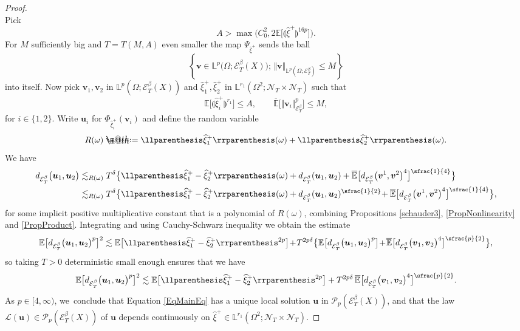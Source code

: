 \documentclass[JEP,XML,SOM,Unicode,published]{cedram}
\makeatletter
\theoremstyle{definition}
\newcommand\bbE{\mathbb{E}}
\newcommand{\mcE}{\mathcal{E}}
\newcommand{\mcL}{\mathcal{L}}
\newcommand{\mcN}{\mathcal{N}}
\newcommand{\mcP}{\mathcal{P}}
\newcommand{\bbL}{\mathbb{L}}
\newcommand{\bsu}{\boldsymbol{u}}
\newcommand{\bsv}{\boldsymbol{v}}
\newcommand*{\defeq}{\mathrel{\rlap{%
\raisebox{0.3ex}{$\m@th\cdot$}}%
\raisebox{-0.3ex}{$\m@th\cdot$}}%
=}
\newcommand{\dab}{\mcE^\beta_T}
\newcommand{\norme}[1]{\Vert #1 \Vert}
\makeatother
\begin{document}
\begin{proof}
\[\]
Pick
\[
A > \max\bigl(C_0^2, 2\bbE\bigl[\llparenthesis\widehat\xi^+\rrparenthesis^{16p}\bigr]\bigr).
\]
For $M$ sufficiently big and $T=T(M,A)$ even smaller the map $\Psi_{\widehat\xi^+}$ sends the ball
\[
\left\{ \bsv \in \bbL^p\bigl(\Omega; \dab(X)\bigr);\, \norme{\bsv}_{\bbL^p(\Omega; \dab)}\leq M\right\}
\]
into itself. Now pick $\bsv_1, \bsv_2$ in $\bbL^p(\Omega; \dab(X))$ and $\widehat\xi^+_1, \widehat\xi^+_2$ in $\bbL^{r_1}(\Omega^2; {{\boldsymbol{\mcN}}_T}\times{{\boldsymbol{\mcN}}_T})$ such that
\[
\bbE\bigl[\llparenthesis\widehat\xi^+_i\rrparenthesis^{r_1}\bigr] \leq A, \qquad \overline{\bbE}\bigl[\norme{\bsv_i}_{\dab}^p\bigr] \leq M,
\]
for $i\in\{1,2\}$. Write $\bsu_i$ for $\Phi_{\widehat\xi^+_i}(\bsv_i)$ and define the random variable
\[
R(\omega) \defeq \llparenthesis \widehat\xi^+_1\rrparenthesis(\omega) + \llparenthesis \widehat\xi^+_2\rrparenthesis(\omega).
\]
We have
\begin{equation*} \begin{split}
d_{\mcE_T^\beta}\bigl(\bsu_1, \bsu_2\bigr) &\lesssim_{R(\omega)} T^\delta \bigl\{ \llparenthesis \widehat\xi^+_1 - \widehat\xi^+_2\rrparenthesis(\omega) + d_{\mcE^\beta_T}(\bsu_1, \bsu_2) + \overline{\bbE}\bigl[d_{\dab}{\bigl(\bsv^1, \bsv^2\bigr)^4}\bigr]^{\sfrac{1}{4}} \bigr\}
\\
& \lesssim_{R(\omega)} T^\delta \bigl\{ \llparenthesis \widehat\xi^+_1 - \widehat\xi^+_2\rrparenthesis(\omega) + d_{\mcE^\beta_T}(\bsu_1, \bsu_2)^{\sfrac{1}{2}}\hspace{-2pt} + \overline{\bbE}\bigl[d_{\dab}{\bigl(\bsv^1,\bsv^2\bigr)^4}\bigr]^{\sfrac{1}{4}} \bigr\},
\end{split} \end{equation*}
for some implicit positive multiplicative constant that is a polynomial of $R(\omega)$, combining Propositions \ref{schauder3}, \ref{PropNonlinearity} and \ref{PropProduct}. Integrating and using Cauchy-Schwarz inequality we obtain the estimate
\begin{align*}
\bbE\bigl[d_{\mcE_T^\beta}\bigl(\bsu_1, \bsu_2\bigr)^p \bigr]^2 \lesssim \bbE\bigl[ \llparenthesis \widehat\xi^+_1 - \widehat\xi^+_2\rrparenthesis^{2p}\bigr] \!+\! T^{2p\delta} \bigl\{ \bbE\bigl[ d_{\mcE_T^\beta}\bigl(\bsu_1, \bsu_2\bigr)^{p} \bigr] \!+\! \overline{\bbE}\bigl[d_{\dab}\bigl(\bsv_1, \bsv_2\bigr)^4\bigr]^{\sfrac{p}{2}} \bigr\},
\end{align*}
so taking $T>0$ deterministic small enough ensures that we have
\begin{align*}
\bbE\bigl[ d_{\mcE_T^\beta}\bigl(\bsu_1, \bsu_2\bigr)^{p} \bigr]^2 \lesssim \bbE\bigl[ \llparenthesis \widehat\xi^+_1 - \widehat\xi^+_2\rrparenthesis^{2p}\bigr] + T^{2p\delta} \, \overline{\bbE}\bigl[d_{\dab}\bigl(\bsv_1, \bsv_2\bigr)^4\bigr]^{\sfrac{p}{2}}.
\end{align*}
As $p\in[4,\infty)$, we~conclude that Equation \eqref{EqMainEq} has a unique local solution $\bsu$ in $\mcP_p(\dab(X))$, and that the law $\mcL(\bsu) \in \mcP_p(\dab(X))$ of $\bsu$ depends continuously on $\widehat\xi^+\in \bbL^{r_1}(\Omega^2; {{\boldsymbol{\mcN}}_T}\times{{\boldsymbol{\mcN}}_T})$.


\end{proof}
\end{document}
